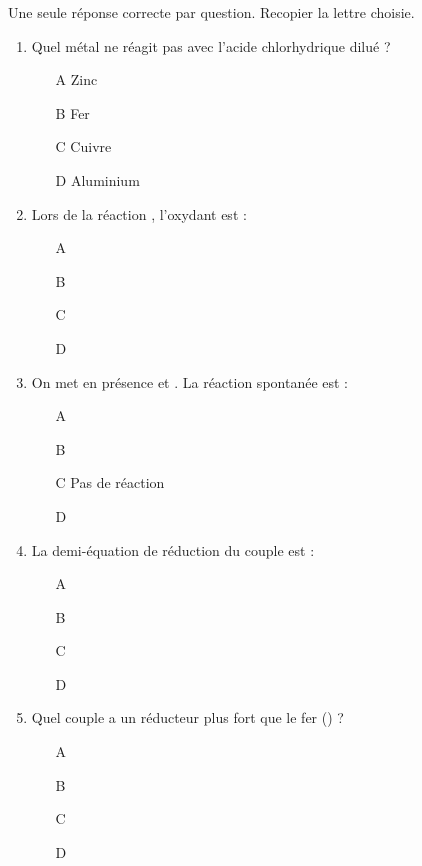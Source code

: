 \documentclass[11pt]{article}
\begin{document}
\begin{exercice}
Une seule réponse correcte par question. Recopier la lettre choisie.
\begin{enumerate}
    \item Quel métal ne réagit pas avec l'acide chlorhydrique dilué ?
    \begin{itemize}
        \item[A] Zinc \item[B] Fer \item[C] Cuivre \item[D] Aluminium
    \end{itemize}
    \item Lors de la réaction , l'oxydant est :
    \begin{itemize}
        \item[A]  \item[B]  \item[C]  \item[D] 
    \end{itemize}
    \item On met en présence  et . La réaction spontanée est :
    \begin{itemize}
        \item[A]  \item[B] 
        \item[C] Pas de réaction \item[D] 
    \end{itemize}
    \item La demi-équation de réduction du couple  est :
    \begin{itemize}
        \item[A]  \item[B] 
        \item[C]  \item[D] 
    \end{itemize}
    \item Quel couple a un réducteur plus fort que le fer () ?
    \begin{itemize}
        \item[A]  \item[B]  \item[C]  \item[D] 
    \end{itemize}
\end{enumerate}
\end{exercice}
\end{document}
